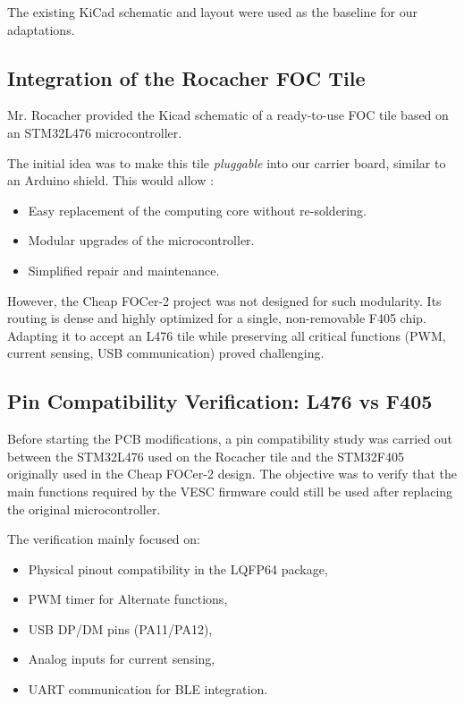 The existing KiCad schematic and layout were used as the baseline for our adaptations.

\subsection{Integration of the Rocacher FOC Tile}

Mr. Rocacher provided the Kicad schematic of a ready-to-use FOC tile based on an STM32L476 microcontroller.

The initial idea was to make this tile \textit{pluggable} into our carrier board, similar to an Arduino shield. This would allow :
\begin{itemize}
    \item Easy replacement of the computing core without re-soldering.
    \item Modular upgrades of the microcontroller.
    \item Simplified repair and maintenance.
\end{itemize}

However, the Cheap FOCer-2 project was not designed for such modularity. Its routing is dense and highly optimized for a single, non-removable F405 chip. Adapting it to accept an L476 tile while preserving all critical functions (PWM, current sensing, USB communication) proved challenging.

\subsection{Pin Compatibility Verification: L476 vs F405}
Before starting the PCB modifications, a pin compatibility study was carried out between the STM32L476 used on the Rocacher tile and the STM32F405 originally used in the Cheap FOCer-2 design. The objective was to verify that the main functions required by the VESC firmware could still be used after replacing the original microcontroller.

The verification mainly focused on:
\begin{itemize}
    \item Physical pinout compatibility in the LQFP64 package,
    \item PWM timer for Alternate functions,
    \item USB DP/DM pins (PA11/PA12),
    \item Analog inputs for current sensing,
    \item UART communication for BLE integration.
\end{itemize}

